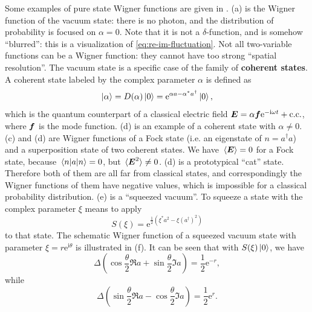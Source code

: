 \documentclass[hyperref, a4paper]{article}
\newcommand*{\ii}{\mathrm{i}}
\newcommand*{\ee}{\mathrm{e}}
\newcommand*{\concept}[1]{{\textbf{#1}}}
\begin{document}
Some examples of pure state Wigner functions are given in .
(a) is the Wigner function of the vacuum state:
there is no photon, 
and the distribution of probability is focused on $\alpha = 0$.
Note that it is not a $\delta$-function,
and is somehow ``blurred'':
this is a visualization of \eqref{eq:re-im-fluctuation}.
Not all two-variable functions can be a Wigner function:
they cannot have too strong ``spatial resolution''.
The vacuum state is a specific case of the family of \concept{coherent states}.
A coherent state labeled by the complex parameter $\alpha$ is defined as 
\begin{equation}
    \ket{\alpha} = D(\alpha) \ket{0} = \ee^{\alpha a - \alpha^* a^\dagger} \ket{0},
\end{equation}
which is the quantum counterpart of a classical electric field $\vb*{E} = \alpha \vb*{f} \ee^{- \ii \omega t} + \text{c.c.}$,
where $\vb*{f}$ is the mode function.
(d) is an example of a coherent state with $\alpha \neq 0$.
(c) and (d) 
are Wigner functions of a Fock state (i.e. an eigenstate of $n = a^\dagger a$)
and a superposition state of two coherent states.
We have $\expval*{\vb*{E}} = 0$ for a Fock state,
because $\expval*{a}{n} = 0$,
but $\expval*{\vb*{E}^2} \neq 0$.
(d) is a prototypical ``cat'' state.
Therefore both of them are all far from classical states,
and correspondingly the Wigner functions of them have negative values,
which is impossible for a classical probability distribution.
(e) is a ``squeezed vacuum''.
To squeeze a state with the complex parameter $\xi$ means to apply 
\begin{equation}
    S(\xi) = \ee^{\frac{1}{2} (\xi^* a^2 - \xi (a^\dagger)^2)}
\end{equation}
to that state.
The schematic Wigner function of a squeezed vacuum state 
with parameter $\xi = r \ee^{\ii \theta}$
is illustrated in (f).
It can be seen that with $S(\xi) \ket{0}$, 
we have \cite{scully1999quantum}
\begin{equation}
    \Delta \left( \cos \frac{\theta}{2} \Re a  + \sin \frac{\theta}{2} \Im a \right)  = \frac{1}{2} \ee^{-r},
    \label{eq:min-op-squeeze}
\end{equation} 
while 
\begin{equation}
    \Delta \left( \sin \frac{\theta}{2} \Re a - \cos \frac{\theta}{2} \Im a \right) = \frac{1}{2} \ee^{r}.
\end{equation}
\end{document}

